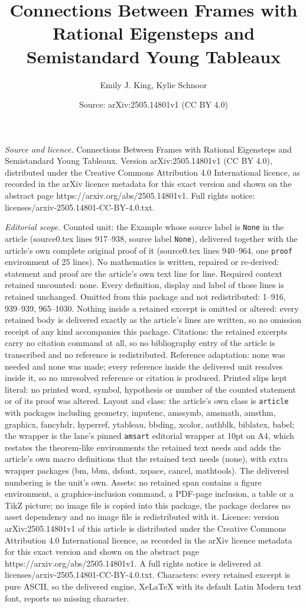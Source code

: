 \documentclass[10pt,a4paper]{amsart}
\title[Connections Between Frames with Rational Eigensteps and Semi]{Connections Between Frames with Rational Eigensteps and Semistandard Young Tableaux}
\author{Emily J. King, Kylie Schnoor}
\date{Source: arXiv:2505.14801v1 (CC BY 4.0)}
\begin{document}
\maketitle

\noindent\emph{Source and licence.} Connections Between Frames with Rational Eigensteps and Semistandard Young Tableaux. Version arXiv:2505.14801v1 (CC BY 4.0), distributed under the Creative Commons Attribution 4.0 International licence, as recorded in the arXiv licence metadata for this exact version and shown on the abstract page https://arxiv.org/abs/2505.14801v1. Full rights notice: licenses/arxiv-2505.14801-CC-BY-4.0.txt.\par\smallskip

\noindent\textit{Editorial scope.} Counted unit: the Example whose source label is \texttt{None} in the article (source0.tex lines 917--938, source label \texttt{None}), delivered together with the article's own complete original proof of it (source0.tex lines 940--964, one \texttt{proof} environment of 25 lines). No mathematics is written, repaired or re-derived: statement and proof are the article's own text line for line. Required context retained uncounted: none. Every definition, display and label of those lines is retained unchanged. Omitted from this package and not redistributed: 1--916, 939--939, 965--1030. Nothing inside a retained excerpt is omitted or altered: every retained body is delivered exactly as the article's lines are written, so no omission receipt of any kind accompanies this package. Citations: the retained excerpts carry no citation command at all, so no bibliography entry of the article is transcribed and no reference is redistributed. Reference adaptation: none was needed and none was made; every reference inside the delivered unit resolves inside it, so no unresolved reference or citation is produced. Printed slips kept literal: no printed word, symbol, hypothesis or number of the counted statement or of its proof was altered. Layout and class: the article's own class is \texttt{article} with packages including geometry, inputenc, amssymb, amsmath, amsthm, graphicx, fancyhdr, hyperref, ytableau, bbding, xcolor, authblk, biblatex, babel; the wrapper is the lane's pinned \texttt{amsart} editorial wrapper at 10pt on A4, which restates the theorem-like environments the retained text needs and adds the article's own macro definitions that the retained text needs (none), with extra wrapper packages (bm, bbm, dsfont, xspace, cancel, mathtools). The delivered numbering is the unit's own. Assets: no retained span contains a figure environment, a graphics-inclusion command, a PDF-page inclusion, a table or a TikZ picture; no image file is copied into this package, the package declares no asset dependency and no image file is redistributed with it. Licence: version arXiv:2505.14801v1 of this article is distributed under the Creative Commons Attribution 4.0 International licence, as recorded in the arXiv licence metadata for this exact version and shown on the abstract page https://arxiv.org/abs/2505.14801v1. A full rights notice is delivered at licenses/arxiv-2505.14801-CC-BY-4.0.txt. Characters: every retained excerpt is pure ASCII, so the delivered engine, XeLaTeX with its default Latin Modern text font, reports no missing character.
\end{document}
